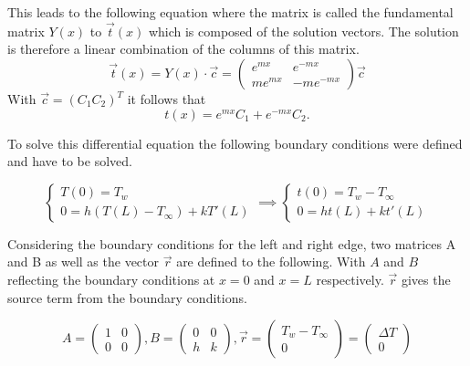 This leads to the following equation where the matrix is called the fundamental matrix $Y(x)$ to $\vec{t}(x)$ which is composed of the solution vectors. The solution is therefore a linear combination of the columns of this matrix.
\begin{equation}
\vec{t}(x) = Y(x)\cdot \vec{c} = \begin{pmatrix}	e^{mx} & e^{-mx}\\	me^{mx} & -me^{-mx} \end{pmatrix} \vec{c}
\end{equation}
With $\vec{c} = (C_1 C_2)^T$ it follows that
\begin{equation}
t(x) = e^{mx}C_{1} + e^{-mx}C_{2}.
\label{eq:ODEt}
\end{equation}

To solve this differential equation the following boundary conditions were defined and have to be solved. 

\begin{equation}
\begin{cases}
T(0) = T_w \\
   0 = h(T(L)-T_{\infty})+kT'(L)
\end{cases}
\implies
\begin{cases}
t(0) = T_w-T_{\infty} \\
   0 = ht(L)+kt'(L)
\end{cases}
\end{equation}

Considering the boundary conditions for the left and right edge, two matrices A and B as well as the vector $\vec{r}$ are defined to the following. With $A$ and $B$ reflecting the boundary conditions at $x = 0$ and $x = L$ respectively. $\vec{r}$ gives the source term from the boundary conditions.

\begin{equation}
\label{eq:ABC}
A = \begin{pmatrix}	1 & 0\\	0 & 0 \end{pmatrix}, B = \begin{pmatrix}	0 & 0\\	h & k \end{pmatrix}, \vec{r} = \begin{pmatrix}	T_w-T_{\infty}\\	0 \end{pmatrix} = \begin{pmatrix}	\Delta T \\	0 \end{pmatrix}
\end{equation}

